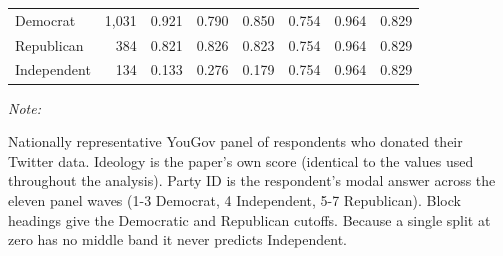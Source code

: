 \begin{table}[!h]
\begin{threeparttable}
\begin{tabular}[t]{lrrrrrrr}
\hspace{1em}Democrat & 1,031 & 0.921 & 0.790 & 0.850 & 0.754 & 0.964 & 0.829\\
\hspace{1em}Republican & 384 & 0.821 & 0.826 & 0.823 & 0.754 & 0.964 & 0.829\\
\hspace{1em}Independent & 134 & 0.133 & 0.276 & 0.179 & 0.754 & 0.964 & 0.829\\
\bottomrule
\end{tabular}
\begin{tablenotes}
\item \textit{Note: } 
\item Nationally representative YouGov panel of respondents who donated their Twitter data. Ideology is the paper's own score (identical to the values used throughout the analysis). Party ID is the respondent's modal answer across the eleven panel waves (1-3 Democrat, 4 Independent, 5-7 Republican). Block headings give the Democratic and Republican cutoffs. Because a single split at zero has no middle band it never predicts Independent.
\end{tablenotes}
\end{threeparttable}
\end{table}
